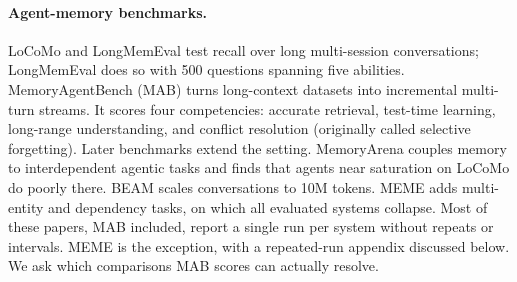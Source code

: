 \paragraph{Agent-memory benchmarks.}
LoCoMo \citep{maharana2024locomo} and LongMemEval \citep{wu2025longmemeval} test recall over long multi-session conversations; LongMemEval does so with 500 questions spanning five abilities. MemoryAgentBench (MAB) \citep{hu2026memoryagentbench} turns long-context datasets into incremental multi-turn streams. It scores four competencies: accurate retrieval, test-time learning, long-range understanding, and conflict resolution (originally called selective forgetting). Later benchmarks extend the setting. MemoryArena \citep{he2026memoryarena} couples memory to interdependent agentic tasks and finds that agents near saturation on LoCoMo do poorly there. BEAM \citep{tavakoli2026beam} scales conversations to 10M tokens. MEME \citep{jung2026meme} adds multi-entity and dependency tasks, on which all evaluated systems collapse. Most of these papers, MAB included, report a single run per system without repeats or intervals. MEME is the exception, with a repeated-run appendix discussed below. We ask which comparisons MAB scores can actually resolve.

